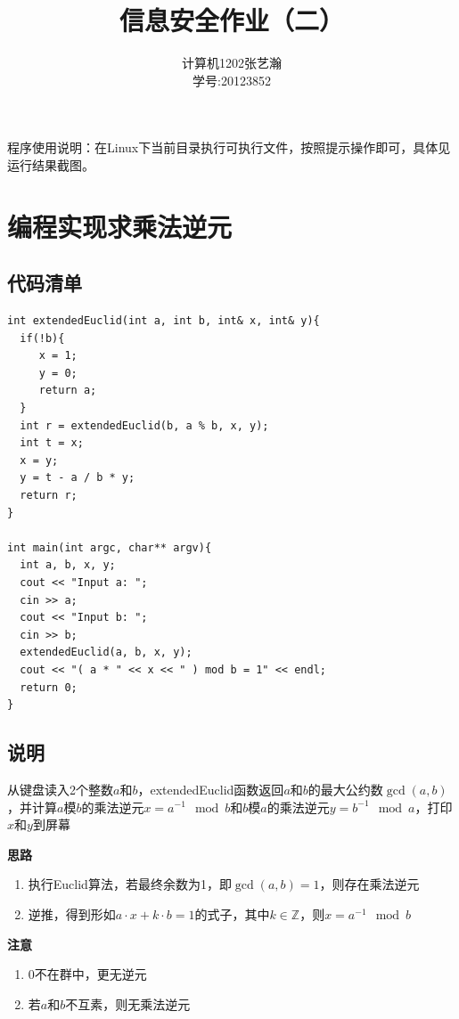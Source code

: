 \documentclass[11pt]{article}
\begin{document}
\title{信息安全作业（二）}
\author{计算机1202\quad 张艺瀚\\学号:20123852}
\maketitle

\thispagestyle{fancy}
\normalsize

程序使用说明：在Linux下当前目录执行可执行文件，按照提示操作即可，具体见运行结果截图。

\section{编程实现求乘法逆元}
\subsection{代码清单}
\begin{center}
\begin{lstlisting}[caption = {扩展的Euclid算法求乘法逆元的C++实现}, label = {lst: code1}]
int extendedEuclid(int a, int b, int& x, int& y){
  if(!b){
     x = 1;
     y = 0;
     return a;
  }
  int r = extendedEuclid(b, a % b, x, y);
  int t = x;
  x = y;
  y = t - a / b * y;
  return r;
}

int main(int argc, char** argv){
  int a, b, x, y;
  cout << "Input a: ";
  cin >> a;
  cout << "Input b: ";
  cin >> b;
  extendedEuclid(a, b, x, y);
  cout << "( a * " << x << " ) mod b = 1" << endl;
  return 0;
}
\end{lstlisting}
\end{center}

\subsection{说明}
从键盘读入2个整数$a$和$b$，extendedEuclid函数返回$a$和$b$的最大公约数$\gcd (a, b)$，并计算$a$模$b$的乘法逆元$x = a^{-1} \mod b$和$b$模$a$的乘法逆元$y = b^{-1} \mod a$，打印$x$和$y$到屏幕

\textbf{思路}
\begin{enumerate}
\item 执行Euclid算法，若最终余数为1，即$\gcd (a, b) = 1$，则存在乘法逆元
\item 逆推，得到形如$a \cdot x + k \cdot b = 1$的式子，其中$k \in \mathbb{Z}$，则$x = a^{-1} \mod b$
\end{enumerate}

\textbf{注意}
\begin{enumerate}
\item 0不在群中，更无逆元
\item 若$a$和$b$不互素，则无乘法逆元
\end{enumerate}
\end{document}
